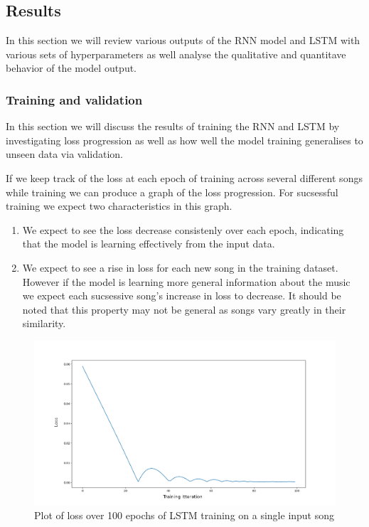 \documentclass{article}
\begin{document}
\subsection{Results}
\label{sec:results}
In this section we will review various outputs of the RNN model and LSTM with various sets of hyperparameters as well analyse the qualitative and quantitave behavior of the model output. 

\subsubsection{Training and validation}
In this section we will discuss the results of training the RNN and LSTM by investigating loss progression as well as how well the model training generalises to unseen data via validation.

If we keep track of the loss at each epoch of training across several different songs while training we can produce a graph of the loss progression. For sucsessful training we expect two characteristics in this graph.
\begin{enumerate}
\item We expect to see the loss decrease consistenly over each epoch, indicating that the model is learning effectively from the input data.
\item We expect to see a rise in loss for each new song in the training dataset. However if the model is learning more general information about the music we expect each sucsessive song's increase in loss to decrease. It should be noted that this property may not be general as songs vary greatly in their similarity.
\end{enumerate}
\begin{figure}[H]
\caption{Plot of loss over 100 epochs of LSTM training on a single input song}
\includegraphics[scale=0.35]{loss_plot_100itr.png}
\end{figure}
\end{document}
